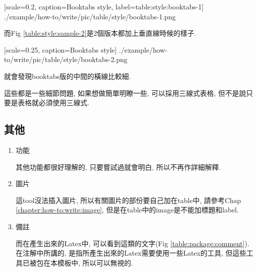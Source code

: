     {
      [scale=0.2,
        caption={Booktabs style},
        label={table:style:booktabs-1}]
      {./example/how-to/write/pic/table/style/booktabs-1.png}
    }

  而Fig \ref{table:style:sample-2}是2個版本都加上垂直線時候的樣子.

    {
      [scale=0.25,
        caption={Booktabs style}]
      {./example/how-to/write/pic/table/style/booktabs-2.png}
    }

  就會發現booktabs版的中間的橫線比較細.

  這些都是一些細節問題, 如果想做簡單明瞭一些, 可以採用三線式表格, 但不是說只要是表格就必須使用三線式.

\subsection{其他}

  \begin{enumerate}

    \item
    {
      功能

      其他功能都很好理解的, 只要嘗試過就會明白, 所以不再作詳細解釋.
    } %

    \item
    {
      圖片

      這tool沒法插入圖片, 所以有關圖片的部份要自己加在table中, 請參考Chap \ref{chapter:how-to:write:image}, 但是在table中的image是不能加標題和label.
    } %


    \item
    {
      備註

      而在產生出來的Latex中, 可以看到這類的文字(Fig \ref{table:package:comment}). 在注解中所講的, 是指所產生出來的Latex需要使用一些Latex的工具, 但這些工具已被包在本模板中, 所以可以無視的.
    } %
  \end{enumerate}

\EndChapter
